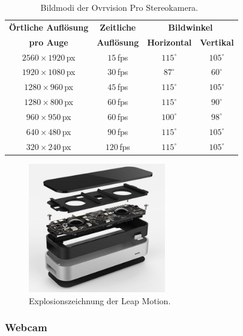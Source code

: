 \begin{table}
	\centering
	\begin{tabular}{|c|c|c|c|}
		\hline
		\Absatzbox{}
		\textbf{Örtliche Auflösung}& \textbf{Zeitliche} & \multicolumn{2}{c|}{\textbf{Bildwinkel}}\\
		\cline{3-4}
		\Absatzbox{}
		\textbf{pro Auge}& \textbf{Auflösung} & \textbf{Horizontal} & \textbf{Vertikal}\\
		\hline
		$2560\times1920$\,px & $15$\,fps & $115^\circ$ & $105^\circ$\\
		\hline
		$1920\times1080$\,px & $30$\,fps & $87^\circ$ & $60^\circ$\\
		\hline
		$1280\times960$\,px & $45$\,fps & $115^\circ$ & $105^\circ$\\
		\hline
		$1280\times800$\,px & $60$\,fps & $115^\circ$ & $90^\circ$\\
		\hline
		$960\times950$\,px & $60$\,fps & $100^\circ$ & $98^\circ$\\
		\hline
		$640\times480$\,px & $90$\,fps & $115^\circ$ & $105^\circ$\\
		\hline
		$320\times240$\,px & $120$\,fps & $115^\circ$ & $105^\circ$\\
		\hline
	\end{tabular}
	\caption{Bildmodi der Ovrvision Pro Stereokamera.~\cite{website:ovrvisionProduct}}
	\label{tab:ovrRes}
\end{table}


\begin{figure}[H]
	\centering
	\includegraphics[width=6cm]{Bilder/leap-motion.png}			
		\caption{Explosionszeichnung der Leap Motion.\cite{website:LeapMotionBlog}}
		\label{fig:leapMotion}
\end{figure}
\subsubsection{Webcam}\label{sec:webcam} 

